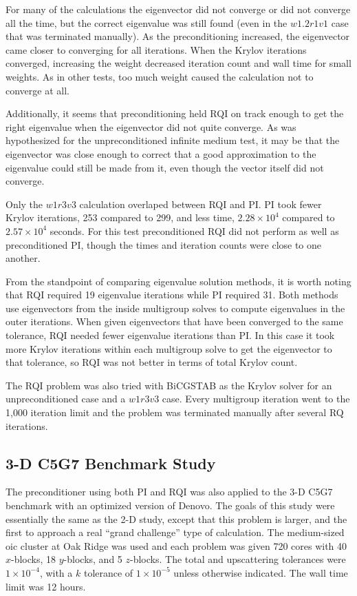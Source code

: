 For many of the calculations the eigenvector did not converge or did not converge all the time, but the correct eigenvalue was still found (even in the $w1.2r1v1$ case that was terminated manually). As the preconditioning increased, the eigenvector came closer to converging for all iterations. When the Krylov iterations converged, increasing the weight decreased iteration count and wall time for small weights. As in other tests, too much weight caused the calculation not to converge at all. 

Additionally, it seems that preconditioning held RQI on track enough to get the right eigenvalue when the eigenvector did not quite converge. As was hypothesized for the unpreconditioned infinite medium test, it may be that the eigenvector was close enough to correct that a good approximation to the eigenvalue could still be made from it, even though the vector itself did not converge. 

Only the $w1r3v3$ calculation overlaped between RQI and PI. PI took fewer Krylov iterations, 253 compared to 299, and less time, $2.28 \times 10^{4}$ compared to $2.57 \times 10^{4}$ seconds. For this test preconditioned RQI did not perform as well as preconditioned PI, though the times and iteration counts were close to one another. 

From the standpoint of comparing eigenvalue solution methods, it is worth noting that RQI required 19 eigenvalue iterations while PI required 31. Both methods use eigenvectors from the inside multigroup solves to compute eigenvalues in the outer iterations. When given eigenvectors that have been converged to the same tolerance, RQI needed fewer eigenvalue iterations than PI. In this case it took more Krylov iterations within each multigroup solve to get the eigenvector to that tolerance, so RQI was not better in terms of total Krylov count.

The RQI problem was also tried with BiCGSTAB as the Krylov solver for an unpreconditioned case and a $w1r3v3$ case. Every multigroup iteration went to the 1,000 iteration limit and the problem was terminated manually after several RQ iterations.

 \subsection{3-D C5G7 Benchmark Study}
The preconditioner using both PI and RQI was also applied to the 3-D C5G7 benchmark with an optimized version of Denovo. The goals of this study were essentially the same as the 2-D study, except that this problem is larger, and the first to approach a real ``grand challenge'' type of calculation. The medium-sized oic cluster at Oak Ridge was used and each problem was given 720 cores with 40 $x$-blocks, 18 $y$-blocks, and 5 $z$-blocks. The total and upscattering tolerances were $1 \times 10^{-4}$, with a $k$ tolerance of $1 \times 10^{-5}$ unless otherwise indicated. The wall time limit was 12 hours. 

